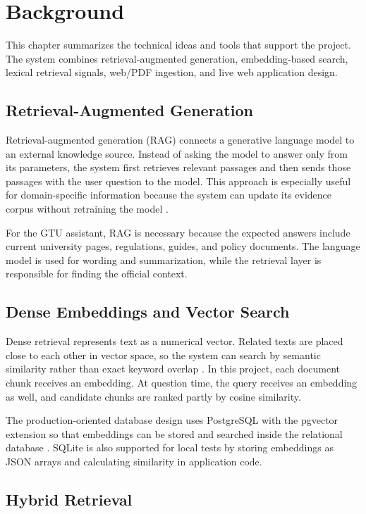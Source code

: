 \chapter{Background}

This chapter summarizes the technical ideas and tools that support the project. The system combines retrieval-augmented generation, embedding-based search, lexical retrieval signals, web/PDF ingestion, and live web application design.

\section{Retrieval-Augmented Generation}

Retrieval-augmented generation (RAG) connects a generative language model to an external knowledge source. Instead of asking the model to answer only from its parameters, the system first retrieves relevant passages and then sends those passages with the user question to the model. This approach is especially useful for domain-specific information because the system can update its evidence corpus without retraining the model \cite{lewis2020rag}.

For the GTU assistant, RAG is necessary because the expected answers include current university pages, regulations, guides, and policy documents. The language model is used for wording and summarization, while the retrieval layer is responsible for finding the official context.

\section{Dense Embeddings and Vector Search}

Dense retrieval represents text as a numerical vector. Related texts are placed close to each other in vector space, so the system can search by semantic similarity rather than exact keyword overlap \cite{karpukhin2020dpr}. In this project, each document chunk receives an embedding. At question time, the query receives an embedding as well, and candidate chunks are ranked partly by cosine similarity.

The production-oriented database design uses PostgreSQL with the pgvector extension so that embeddings can be stored and searched inside the relational database \cite{pgvector}. SQLite is also supported for local tests by storing embeddings as JSON arrays and calculating similarity in application code.

\section{Hybrid Retrieval}

